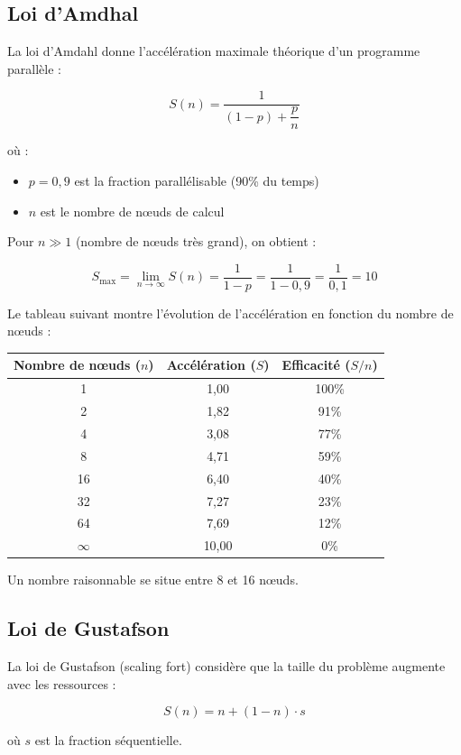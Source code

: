 \documentclass{article}
\begin{document}
\subsection{Loi d'Amdhal}

La loi d'Amdahl donne l'accélération maximale théorique d'un programme parallèle :

\[S(n) = \frac{1}{(1 - p) + \dfrac{p}{n}}\]

où :
\begin{itemize}
    \item $p = 0,9$ est la fraction parallélisable (90\% du temps)
    \item $n$ est le nombre de nœuds de calcul
\end{itemize}

Pour $n \gg 1$ (nombre de nœuds très grand), on obtient :

\[
S_{\text{max}} = \lim_{n \to \infty} S(n) = \frac{1}{1 - p} = \frac{1}{1 - 0,9} = \frac{1}{0,1} = 10
\]

Le tableau suivant montre l'évolution de l'accélération en fonction du nombre de nœuds :

\begin{center}
\begin{tabular}{ccc}
Nombre de nœuds ($n$) & Accélération ($S$) & Efficacité ($S/n$) \\
\hline
1 & 1,00 & 100\% \\
2 & 1,82 & 91\% \\
4 & 3,08 & 77\% \\
8 & 4,71 & 59\% \\
16 & 6,40 & 40\% \\
32 & 7,27 & 23\% \\
64 & 7,69 & 12\% \\
$\infty$ & 10,00 & 0\% \\
\end{tabular}
\end{center}

Un nombre raisonnable se situe entre 8 et 16 nœuds.

\subsection{Loi de Gustafson}

La loi de Gustafson (scaling fort) considère que la taille du problème augmente avec les ressources :

\[
S(n) = n + (1 - n) \cdot s
\]

où $s$ est la fraction séquentielle.
\end{document}

